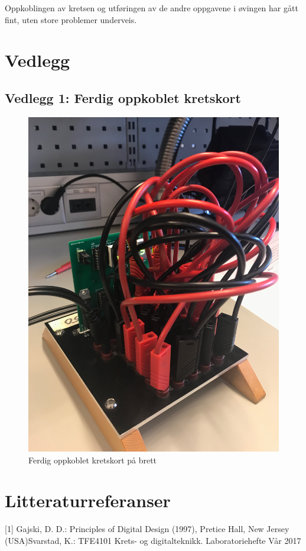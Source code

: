 \documentclass{article}
\begin{document}
Oppkoblingen av kretsen og utføringen av de andre oppgavene i øvingen har gått fint, uten store problemer underveis.

\newpage


\section{Vedlegg}
\subsection{Vedlegg 1: Ferdig oppkoblet kretskort}
\begin{figure}[H]
	\centering
	\includegraphics[width=0.7\linewidth]{IMG_2923}
	\caption{Ferdig oppkoblet kretskort på brett}
	\label{fig:IMG_2923}
\end{figure}

\section{Litteraturreferanser}
[1] Gajski, D. D.: Principles of Digital Design (1997), Pretice Hall, New Jersey (USA)\newline
[2] Svarstad, K.: TFE4101 Krets- og digitalteknikk. Laboratoriehefte Vår 2017
\end{document}
